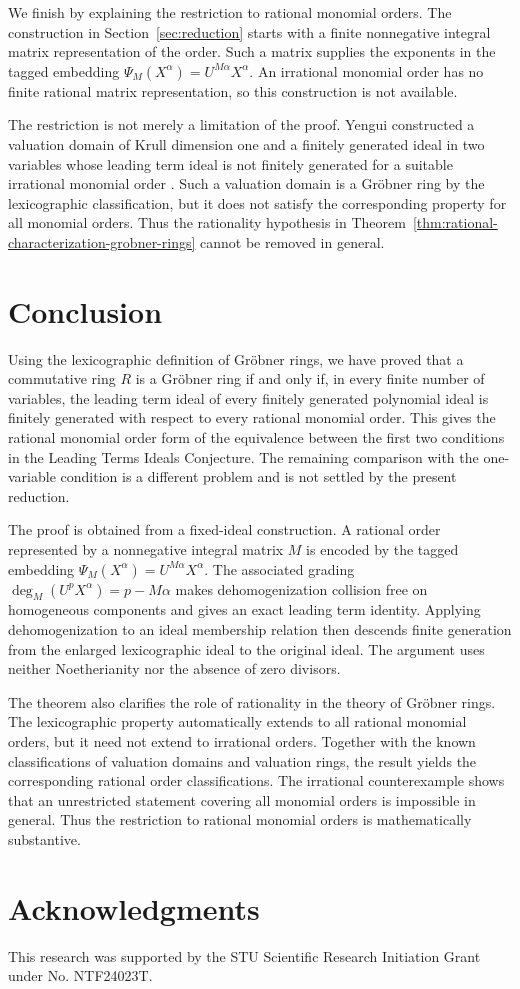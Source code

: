\documentclass[preprint,12pt,3p]{elsarticle}
\theoremstyle{definition}
\theoremstyle{remark}
\begin{document}
	We finish by explaining the restriction to rational monomial orders.
	The construction in Section~\ref{sec:reduction} starts with a finite
	nonnegative integral matrix representation of the order. Such a
	matrix supplies the exponents in the tagged embedding
	$\Psi_M(X^\alpha)= U^{M\alpha}X^\alpha$. An irrational monomial order
	has no finite rational matrix representation, so this construction is
	not available.
	
	The restriction is not merely a limitation of the proof. Yengui
	constructed a valuation domain of Krull dimension one and a finitely
	generated ideal in two variables whose leading term ideal is not
	finitely generated for a suitable irrational monomial order
	\cite{Yengui2021Counterexample}. Such a valuation domain is a
	Gr\"obner ring by the lexicographic classification, but it does not
	satisfy the corresponding property for all monomial orders. Thus the
	rationality hypothesis in
	Theorem~\ref{thm:rational-characterization-grobner-rings} cannot be
	removed in general.
	
	\section{Conclusion}
	\label{sec:conclusion}
	
	Using the lexicographic definition of Gr\"obner rings, we have proved
	that a commutative ring $R$ is a Gr\"obner ring if and only if, in
	every finite number of variables, the leading term ideal of every
	finitely generated polynomial ideal is finitely generated with
	respect to every rational monomial order. This gives the rational
	monomial order form of the equivalence between the first two
	conditions in the Leading Terms Ideals Conjecture. The remaining
	comparison with the one-variable condition is a different problem and
	is not settled by the present reduction.
	
	The proof is obtained from a fixed-ideal construction. A rational
	order represented by a nonnegative integral matrix $M$ is encoded by
	the tagged embedding $\Psi_M(X^\alpha)= U^{M\alpha}X^\alpha$. The
	associated grading $\deg_M( U^pX^\alpha)=p-M\alpha$ makes
	dehomogenization collision free on homogeneous components and gives
	an exact leading term identity. Applying dehomogenization to an ideal
	membership relation then descends finite generation from the enlarged
	lexicographic ideal to the original ideal. The argument uses neither
	Noetherianity nor the absence of zero divisors.
	
	The theorem also clarifies the role of rationality in the theory of
	Gr\"obner rings. The lexicographic property automatically extends to
	all rational monomial orders, but it need not extend to irrational
	orders. Together with the known classifications of valuation domains
	and valuation rings, the result yields the corresponding rational
	order classifications. The irrational counterexample shows that an unrestricted statement
	covering all monomial orders is impossible in general. Thus the
	restriction to rational monomial orders is mathematically
	substantive.
	
	\section*{Acknowledgments}
	This research was supported by the STU Scientific Research Initiation
	Grant under No. NTF24023T.
	
	
	
\end{document}
